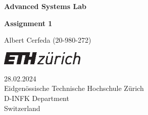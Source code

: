 \documentclass[tikz,14pt,fleqn]{article}
\newcommand\namesurname{Albert Cerfeda (20-980-272)}
\newcommand\assignment{Assignment 1}
\newcommand\subject{Advanced Systems Lab}
\newcommand\documentdate{28.02.2024}
\begin{document}
\begin{titlepage}
   \begin{center}
       \vspace*{0.2cm}

       \textbf{\Large{\subject}}

       \vspace{0.5cm}
        \textbf{\assignment}\\[5mm]
        
            
       \vspace{0.4cm}

        \namesurname
        \begin{figure}[H]
            \centering
        \end{figure}
       \tableofcontents

       \vspace*{\fill}
     
        \includegraphics[width=0.3\textwidth]{fig/eth_logo_kurz_pos.eps}
       
        \documentdate \\
        Eidgenössische Technische Hochschule Zürich\\
        D-INFK Department\\
        Switzerland\\

   \end{center}
\end{titlepage}

\renewcommand{\thesubsubsection}{\alph{subsubsection})}
\setcounter{section}{1}
\setcounter{subsection}{1}




\end{document}
